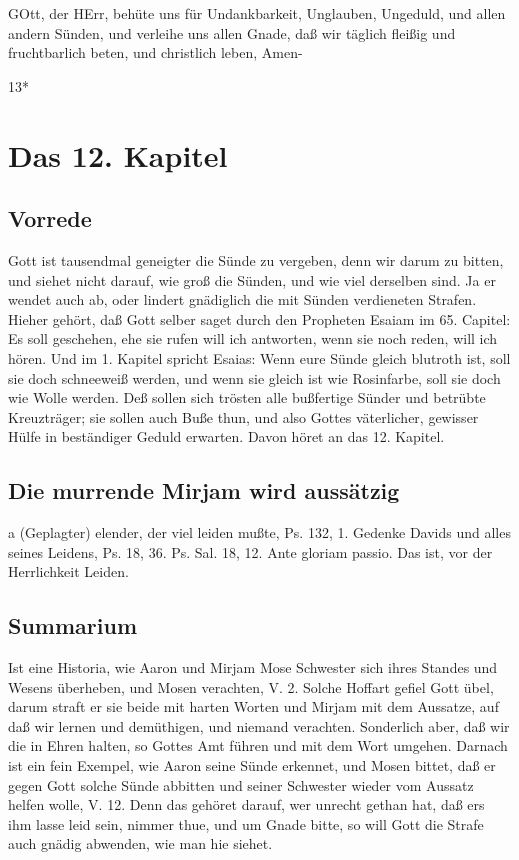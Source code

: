 GOtt, der HErr, behüte uns für Undankbarkeit, Unglauben, Ungeduld, und allen andern Sünden, und verleihe uns allen Gnade, daß wir täglich fleißig und fruchtbarlich beten, und christlich leben, Amen-

13*

\chapter{Das 12. Kapitel}

\section{Vorrede}

Gott ist tausendmal geneigter die Sünde zu vergeben, denn wir darum zu bitten, und siehet nicht darauf, wie groß die Sünden, und wie viel derselben sind. Ja er wendet auch ab, oder lindert gnädiglich die mit Sünden verdieneten Strafen. Hieher gehört, daß Gott selber saget durch den Propheten Esaiam im 65. Capitel: Es soll geschehen, ehe sie rufen will ich antworten, wenn sie noch reden, will ich hören. Und im 1. Kapitel spricht Esaias: Wenn eure Sünde gleich blutroth ist, soll sie doch schneeweiß werden, und wenn sie gleich ist wie Rosinfarbe, soll sie doch wie Wolle werden. Deß sollen sich trösten alle bußfertige Sünder und betrübte Kreuzträger; sie sollen auch Buße thun, und also Gottes väterlicher, gewisser Hülfe in beständiger Geduld erwarten. Davon höret an das 12. Kapitel.

\section{Die murrende Mirjam wird aussätzig}

a (Geplagter) elender, der viel leiden mußte, Ps. 132, 1. Gedenke Davids und alles seines Leidens, Ps. 18, 36. Ps. Sal. 18, 12. Ante gloriam passio. Das ist, vor der Herrlichkeit Leiden.

\section{Summarium}

Ist eine Historia, wie Aaron und Mirjam Mose Schwester sich ihres Standes und Wesens überheben, und Mosen verachten, V. 2. Solche Hoffart gefiel Gott übel, darum straft er sie beide mit harten Worten und Mirjam mit dem Aussatze, auf daß wir lernen und demüthigen, und niemand verachten. Sonderlich aber, daß wir die in Ehren halten, so Gottes Amt führen und mit dem Wort umgehen. Darnach ist ein fein Exempel, wie Aaron seine Sünde erkennet, und Mosen bittet, daß er gegen Gott solche Sünde abbitten und seiner Schwester wieder vom Aussatz helfen wolle, V. 12. Denn das gehöret darauf, wer unrecht gethan hat, daß ers ihm lasse leid sein, nimmer thue, und um Gnade bitte, so will Gott die Strafe auch gnädig abwenden, wie man hie siehet.

